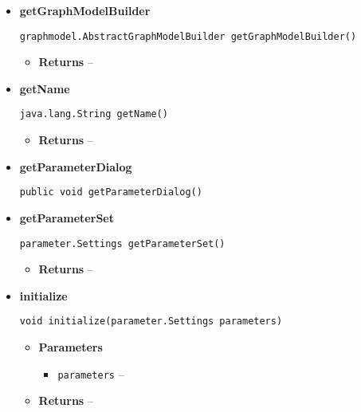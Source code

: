{{{{{{{{{{{{{{{{{\begin{itemize}
{\begin{itemize}
{}%
\end{itemize}
}%
\item{ 
{\bf  getGraphModelBuilder}\\
\begin{lstlisting}[frame=none]
graphmodel.AbstractGraphModelBuilder getGraphModelBuilder()\end{lstlisting} %
\begin{itemize}
\item{{\bf  Returns} -- 
 
}%
\end{itemize}
}%
\item{ 
{\bf  getName}\\
\begin{lstlisting}[frame=none]
java.lang.String getName()\end{lstlisting} %
\begin{itemize}
\item{{\bf  Returns} -- 
 
}%
\end{itemize}
}%
\item{ 
{\bf  getParameterDialog}\\
\begin{lstlisting}[frame=none]
public void getParameterDialog()\end{lstlisting} %
}%
\item{ 
{\bf  getParameterSet}\\
\begin{lstlisting}[frame=none]
parameter.Settings getParameterSet()\end{lstlisting} %
\begin{itemize}
\item{{\bf  Returns} -- 
 
}%
\end{itemize}
}%
\item{ 
{\bf  initialize}\\
\begin{lstlisting}[frame=none]
void initialize(parameter.Settings parameters)\end{lstlisting} %
\begin{itemize}
\item{
{\bf  Parameters}
  \begin{itemize}
   \item{
\texttt{parameters} -- }
  \end{itemize}
}%
\item{{\bf  Returns} -- 
 
}
\end{itemize}}
\end{itemize}}}}}}}}}}}}}}}}}}
